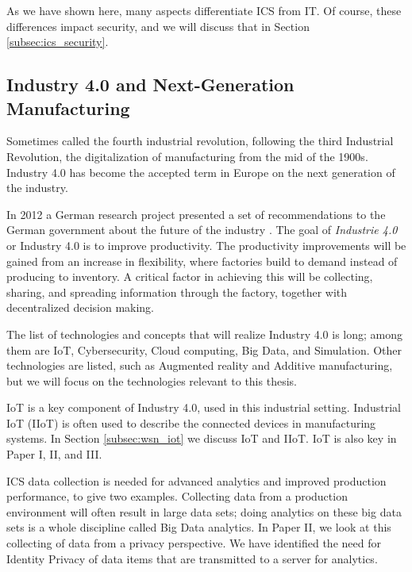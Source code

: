 As we have shown here, many aspects differentiate ICS from IT. Of course, these differences impact security, and we will discuss that in Section \ref{subsec:ics_security}.

\subsection{Industry 4.0 and Next-Generation Manufacturing}
\label{subsec:i4}
Sometimes called the fourth industrial revolution, following the third Industrial Revolution, the digitalization of manufacturing from the mid of the 1900s. Industry 4.0 has become the accepted term in Europe on the next generation of the industry.

In 2012 a German research project presented a set of recommendations to the German government about the future of the industry \cite{kagermann2013recommendations}. The goal of \emph{Industrie 4.0} or Industry 4.0 is to improve productivity. The productivity improvements will be gained from an increase in flexibility, where factories build to demand instead of producing to inventory. A critical factor in achieving this will be collecting, sharing, and spreading information through the factory, together with decentralized decision making.

The list of technologies and concepts that will realize Industry 4.0 is long; among them are IoT, Cybersecurity, Cloud computing, Big Data, and Simulation. Other technologies are listed, such as Augmented reality and Additive manufacturing, but we will focus on the technologies relevant to this thesis.

IoT is a key component of Industry 4.0, used in this industrial setting. Industrial IoT (IIoT) is often used to describe the connected devices in manufacturing systems. In Section \ref{subsec:wsn_iot} we discuss IoT and IIoT. IoT is also key in Paper I, II, and III. 

ICS data collection is needed for advanced analytics and improved production performance, to give two examples. Collecting data from a production environment will often result in large data sets; doing analytics on these big data sets is a whole discipline called Big Data analytics. In Paper II, we look at this collecting of data from a privacy perspective. We have identified the need for Identity Privacy of data items that are transmitted to a server for analytics.  

 
